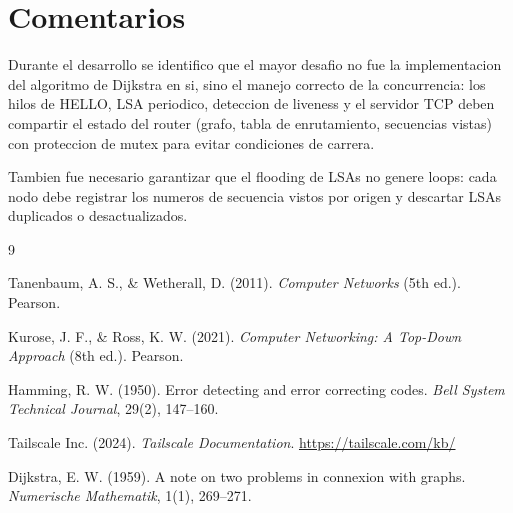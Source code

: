 ﻿\documentclass[12pt, a4paper]{article}
\begin{document}
\section*{Comentarios}

Durante el desarrollo se identifico que el mayor desafio no fue la
implementacion del algoritmo de Dijkstra en si, sino el manejo correcto de la
concurrencia: los hilos de HELLO, LSA periodico, deteccion de liveness y el
servidor TCP deben compartir el estado del router (grafo, tabla de enrutamiento,
secuencias vistas) con proteccion de mutex para evitar condiciones de carrera.

Tambien fue necesario garantizar que el flooding de LSAs no genere loops: cada
nodo debe registrar los numeros de secuencia vistos por origen y descartar LSAs
duplicados o desactualizados.

\begin{thebibliography}{9}

Tanenbaum, A. S., \& Wetherall, D. (2011).
\textit{Computer Networks} (5th ed.). Pearson.

Kurose, J. F., \& Ross, K. W. (2021).
\textit{Computer Networking: A Top-Down Approach} (8th ed.). Pearson.

Hamming, R. W. (1950).
Error detecting and error correcting codes.
\textit{Bell System Technical Journal}, 29(2), 147--160.

Tailscale Inc. (2024).
\textit{Tailscale Documentation}.
\url{https://tailscale.com/kb/}

Dijkstra, E. W. (1959).
A note on two problems in connexion with graphs.
\textit{Numerische Mathematik}, 1(1), 269--271.

\end{thebibliography}
\end{document}
